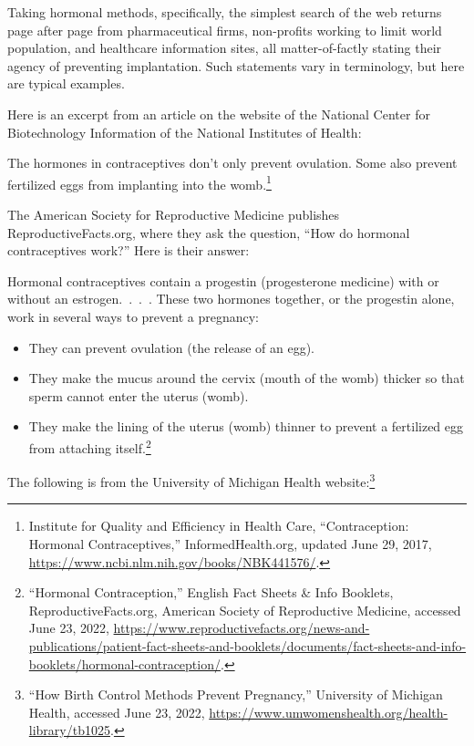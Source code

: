 \documentclass[
]{book}
\begin{document}
Taking hormonal methods, specifically, the simplest search of the web returns page after page from pharmaceutical firms, non-profits working to limit world population, and healthcare information sites, all matter-of-factly stating their agency of preventing implantation. Such statements vary in terminology, but here are typical examples.

Here is an excerpt from an article on the website of the National Center for Biotechnology Information of the National Institutes of Health:

The hormones in contraceptives don't only prevent ovulation. Some also prevent fertilized eggs from implanting into the womb.\footnote{Institute for Quality and Efficiency in Health Care, ``Contraception: Hormonal Contraceptives,'' InformedHealth.org, updated June 29, 2017, \url{https://www.ncbi.nlm.nih.gov/books/NBK441576/}.}

The American Society for Reproductive Medicine publishes ReproductiveFacts.org, where they ask the question, ``How do hormonal contraceptives work?'' Here is their answer:

Hormonal contraceptives contain a progestin (progesterone medicine) with or without an estrogen.~.~.~. These two hormones together, or the progestin alone, work in several ways to prevent a pregnancy:

\begin{itemize}
\item
  They can prevent ovulation (the release of an egg).
\item
  They make the mucus around the cervix (mouth of the womb) thicker so that sperm cannot enter the uterus (womb).
\item
  They make the lining of the uterus (womb) thinner to prevent a fertilized egg from attaching itself.\footnote{``Hormonal Contraception,'' English Fact Sheets \& Info Booklets, ReproductiveFacts.org, American Society of Reproductive Medicine, accessed June 23, 2022, \url{https://www.reproductivefacts.org/news-and-publications/patient-fact-sheets-and-booklets/documents/fact-sheets-and-info-booklets/hormonal-contraception/}.}
\end{itemize}

The following is from the University of Michigan Health website:\footnote{``How Birth Control Methods Prevent Pregnancy,'' University of Michigan Health, accessed June 23, 2022, \url{https://www.umwomenshealth.org/health-library/tb1025}.}
\end{document}
